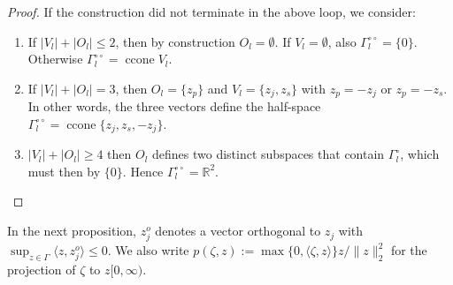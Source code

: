 \documentclass[a4paper,english]{jnsao}
\theoremstyle{definition}
\numberwithin{algorithm}{section}
\newcommand{\cj}[1]{\{ #1\}}
\newcommand{\nr}[2]{ \| #1 \|_{#2}}
\newcommand{\pd}[2]{ \langle #1,#2 \rangle}
\newcommand{\rea}[1]{\mathbb{R}^{#1}}
\def\iprod#1#2{\langle #1, #2 \rangle}
\def\defeq{:=}
\DeclareMathOperator{\ccone}{ccone}
\def\abs#1{|#1|}
\def\polar#1{#1^\circ}
\def\bipolar#1{#1^{\circ\circ}}
\def\ortho{o}
\begin{document}
\begin{proof}
    If the construction did not terminate in the above loop, we consider:
    \begin{enumerate}[label=(\roman*)]
        \item If $\abs{V_l}+\abs{O_l} \le 2$, then by construction $O_l=\emptyset$.
        If $V_l=\emptyset$, also $\bipolar \Gamma_l = \cj{0}$.
        Otherwise $\bipolar \Gamma_l = \ccone V_l$.
        \item If $|V_l| +|O_l| = 3$, then $O_l=\{z_p\}$ and $V_l=\{z_{j}, z_{s}\}$ with $z_{p} = -z_{j}$ or $z_{p} = -z_{s}$. In other words, the three vectors define the half-space $\bipolar \Gamma_l = \ccone\cj{z_{j},z_{s},-z_{j}}$.
        \item $|V_l| +|O_l| \geq 4$ then $O_l$ defines two distinct subspaces that contain $\polar \Gamma_l$, which must then by $\{0\}$. Hence $\bipolar \Gamma _l = \rea{2}$.
        \qedhere
    \end{enumerate}
\end{proof}

In the next proposition, $z_{j}^\ortho$ denotes a vector orthogonal to $z_{j}$ with $\sup_{z \in \Gamma} \iprod{z}{z_j^\ortho} \le 0$.
We also write
$
    p(\zeta, z) \defeq \max \cj{0,\pd{\zeta}{z}}z/\nr{z}{2}^2
$
for the projection of $\zeta$ to $z[0,\infty)$.
\end{document}
